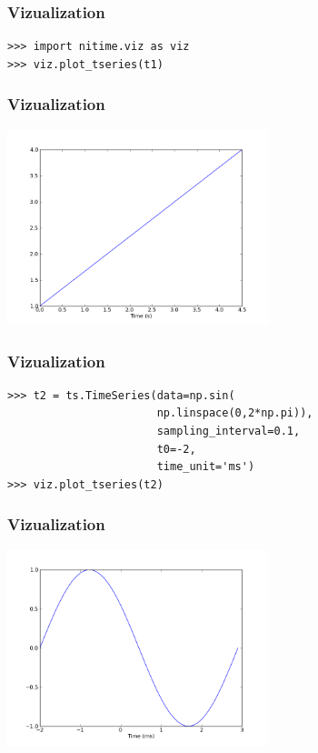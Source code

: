 \documentclass{beamer}
\begin{document}
\begin{frame}[fragile]
\frametitle{Vizualization}
\pause
\begin{lstlisting}
>>> import nitime.viz as viz
>>> viz.plot_tseries(t1)
\end{lstlisting}
\end{frame}

\begin{frame}
\frametitle{Vizualization}
\includegraphics[height=5.7cm]{figures/simple_viz}
\end{frame}

\begin{frame}[fragile]
\frametitle{Vizualization}
\begin{lstlisting}
>>> t2 = ts.TimeSeries(data=np.sin(
                       np.linspace(0,2*np.pi)),
                       sampling_interval=0.1,
                       t0=-2, 
                       time_unit='ms')
>>> viz.plot_tseries(t2)
\end{lstlisting}
\end{frame}

\begin{frame}
\frametitle{Vizualization}
\includegraphics[height=5.7cm]{figures/simple_viz2}
\end{frame}
\end{document}

